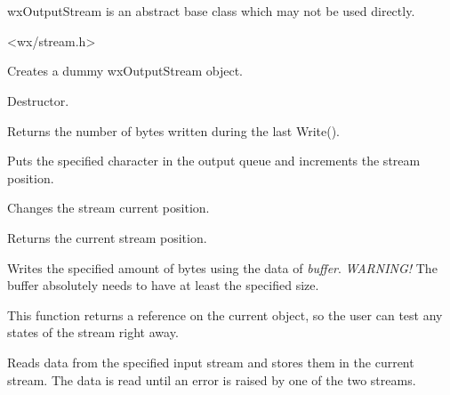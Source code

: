 \section{}\label{wxoutputstream}

wxOutputStream is an abstract base class which may not be used directly.




<wx/stream.h>




Creates a dummy wxOutputStream object.



Destructor.



Returns the number of bytes written during the last Write().



Puts the specified character in the output queue and increments the
stream position.

\label{wxoutputstreamseeko}


Changes the stream current position.



Returns the current stream position.



Writes the specified amount of bytes using the data of {\it buffer}. 
{\it WARNING!} The buffer absolutely needs to have at least the specified size.

This function returns a reference on the current object, so the user can test
any states of the stream right away.


Reads data from the specified input stream and stores them 
in the current stream. The data is read until an error is raised
by one of the two streams.

